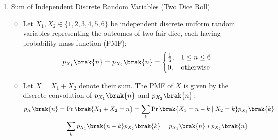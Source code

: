 \begin{enumerate}[label=\thesubsection.\arabic*, ref=\thesubsection.\theenumi,itemsep=0pt]
\item Sum of Independent Discrete Random Variables (Two Dice Roll)
\begin{itemize}
\item Let $X_1, X_2 \in \{1, 2, 3, 4, 5, 6\}$ be independent discrete uniform random variables representing the outcomes of two fair dice, each having probability mass function (PMF):
\begin{align}
p_{X_1}\brak{n} = p_{X_2}\brak{n} = \begin{cases} 
\frac{1}{6}, & 1 \le n \le 6 \\ 
0, & \text{otherwise} 
\end{cases} \label{eq:EE26BTECH11213-dice_uniform_pmf}
\end{align}

\item Let $X = X_1 + X_2$ denote their sum. The PMF of $X$ is given by the discrete convolution of $p_{X_1}\brak{n}$ and $p_{X_2}\brak{n}$:
\begin{align}
p_X\brak{n} &= \Pr\brak{X_1 + X_2 = n} = \sum_{k} \Pr\brak{X_1 = n - k \mid X_2 = k} p_{X_2}\brak{k} \\
&= \sum_{k} p_{X_1}\brak{n - k} p_{X_2}\brak{k} = p_{X_1}\brak{n} * p_{X_2}\brak{n} \label{eq:EE26BTECH11213-dice_convolution}
\end{align}


\end{itemize}
\end{enumerate}
